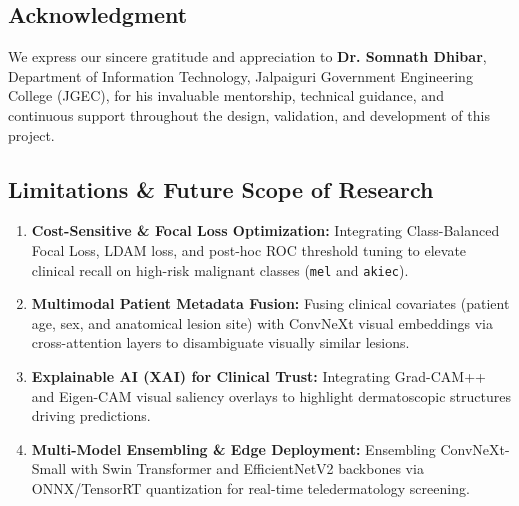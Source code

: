 \documentclass[12pt,a4paper]{article}
\begin{document}
\subsection{Acknowledgment}
We express our sincere gratitude and appreciation to \textbf{Dr. Somnath Dhibar}, Department of Information Technology, Jalpaiguri Government Engineering College (JGEC), for his invaluable mentorship, technical guidance, and continuous support throughout the design, validation, and development of this project.

\subsection{Limitations \& Future Scope of Research}
\begin{enumerate}[leftmargin=*]
    \item \textbf{Cost-Sensitive \& Focal Loss Optimization:} Integrating Class-Balanced Focal Loss, LDAM loss, and post-hoc ROC threshold tuning to elevate clinical recall on high-risk malignant classes (\texttt{mel} and \texttt{akiec}).
    \item \textbf{Multimodal Patient Metadata Fusion:} Fusing clinical covariates (patient age, sex, and anatomical lesion site) with ConvNeXt visual embeddings via cross-attention layers to disambiguate visually similar lesions.
    \item \textbf{Explainable AI (XAI) for Clinical Trust:} Integrating Grad-CAM++ and Eigen-CAM visual saliency overlays to highlight dermatoscopic structures driving predictions.
    \item \textbf{Multi-Model Ensembling \& Edge Deployment:} Ensembling ConvNeXt-Small with Swin Transformer and EfficientNetV2 backbones via ONNX/TensorRT quantization for real-time teledermatology screening.
\end{enumerate}
\end{document}
